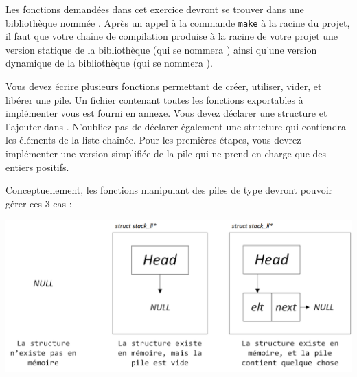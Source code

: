 

\vspace*{0.7cm}

\noindent {}

\bigskip

\noindent Les fonctions demandées dans cet exercice devront se trouver dans une bibliothèque nommée .
Après un appel à la commande \texttt{make} à la racine du projet, il faut que votre chaîne de compilation produise à la racine de votre projet une version statique de la bibliothèque (qui se nommera ) ainsi qu'une version dynamique de la bibliothèque (qui se nommera ).

\bigskip

\noindent Vous devez écrire plusieurs fonctions permettant de créer, utiliser, vider, et libérer une pile.
Un fichier  contenant toutes les fonctions exportables à implémenter vous est fourni en annexe.
Vous devez déclarer une structure  et l'ajouter dans .
N'oubliez pas de déclarer également une structure qui contiendra les éléments de la liste chaînée.
Pour les premières étapes, vous devrez implémenter une version simplifiée de la pile qui ne prend en charge que des entiers positifs.

\bigskip

\noindent Conceptuellement, les fonctions manipulant des piles de type  devront pouvoir gérer ces 3 cas :

\bigskip

\begin{center}
\includegraphics[scale=0.85]{Cours/Piles_Implementation_LL.png}
\end{center}


